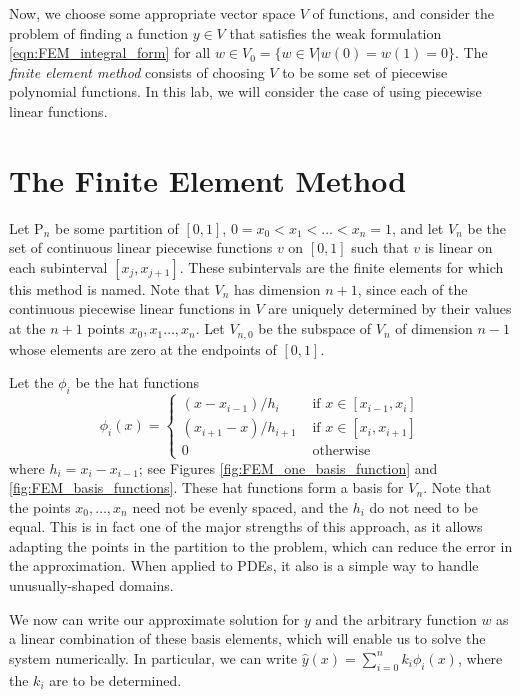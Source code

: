 Now, we choose some appropriate vector space \(V\) of functions, and consider the problem of finding a function $y\in V$ that satisfies the weak formulation \eqref{eqn:FEM_integral_form} for all $w\in V_0 = \{w \in V|w(0) = w(1) = 0\}$.
The \textit{finite element method} consists of choosing \(V\) to be some set of piecewise polynomial functions.
In this lab, we will consider the case of using piecewise linear functions.

\section*{The Finite Element Method}

Let $\mathrm{P}_n$ be some partition of $[0,1]$, $0 = x_0 < x_1< \ldots < x_{n} = 1$, and let $V_n$ be the set of continuous linear piecewise functions $v$ on $[0,1]$ such that $v$ is linear on each subinterval $[x_j,x_{j+1}]$.
These subintervals are the finite elements for which this method is named.
Note that $V_n$ has dimension $n+1$, since each of the continuous piecewise linear functions in $V$ are uniquely determined by their values at the \(n+1\) points \(x_0,x_1\ldots,x_n\).
Let $V_{n,0}$ be the subspace of $V_n$ of dimension $n-1$ whose elements are zero at the endpoints of $[0,1]$.

Let the $\phi_i$ be the hat functions 
\[\phi_i(x) = \begin{cases}
(x - x_{i-1})/h_i &\text{ if } x \in [x_{i-1},x_i]\\
 (x_{i+1} - x)/h_{i+1}  &\text{ if } x \in [x_{i},x_{i+1}]\\
0 &\text{ otherwise}
\end{cases}\]
where $h_i = x_i - x_{i-1}$; see Figures \ref{fig:FEM_one_basis_function} and \ref{fig:FEM_basis_functions}. 
These hat functions form a basis for $V_n$.
Note that the points \(x_0,\ldots,x_n\) need not be evenly spaced, and the \(h_i\) do not need to be equal.
This is in fact one of the major strengths of this approach, as it allows adapting the points in the partition to the problem, which can reduce the error in the approximation.
When applied to PDEs, it also is a simple way to handle unusually-shaped domains.

We now can write our approximate solution for \(y\) and the arbitrary function \(w\) as a linear combination of these basis elements, which will enable us to solve the system numerically.
In particular, we can write \(\hat{y}(x)=\sum_{i=0}^n k_i \phi_i(x)\), where the \(k_i\) are to be determined.

